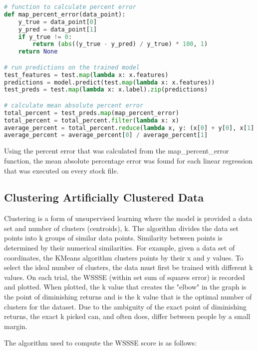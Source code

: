 \documentclass[9pt,twocolumn,twoside]{idsi}
\begin{document}
\begin{lstlisting}[language=Python, breaklines=true]
# function to calculate percent error
def map_percent_error(data_point):
    y_true = data_point[0]
    y_pred = data_point[1]
    if y_true != 0:
        return (abs((y_true - y_pred) / y_true) * 100, 1)
    return None

# run predictions on the trained model
test_features = test.map(lambda x: x.features)
predictions = model.predict(test.map(lambda x: x.features))
test_preds = test.map(lambda x: x.label).zip(predictions)

# calculate mean absolute percent error
total_percent = test_preds.map(map_percent_error)
total_percent = total_percent.filter(lambda x: x)
average_percent = total_percent.reduce(lambda x, y: (x[0] + y[0], x[1] + y[1]))
average_percent = average_percent[0] / average_percent[1]
\end{lstlisting}

Using the percent error that was calculated from the map\_percent\_error function, the mean absolute percentage error was found for each linear regression that was executed on every stock file.

\subsection{Clustering Artificially Clustered Data} 
Clustering is a form of unsupervised learning where the model is provided a data set and number of clusters (centroids), k. The algorithm divides the data set points into k groups of similar data points. Similarity between points is determined by their numerical similarities. For example, given a data set of coordinates, the KMeans algorithm clusters points by their x and y values.
To select the ideal number of clusters, the data must first be trained with different k values. On each trial, the WSSSE (within set sum of squares error) is recorded and plotted. When plotted, the k value that creates the "elbow" in the graph is the point of diminishing returns \cite{martin_2013} and is the k value that is the optimal number of clusters for the dataset. Due to the ambiguity of the exact point of diminishing returns, the exact k picked can, and often does, differ between people by a small margin.


The algorithm used to compute the WSSSE score is as follows:
\end{document}
